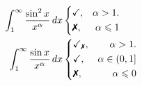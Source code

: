 \begin{minipage}[]{0.35\textwidth}
\begin{equation*}
\begin{split}
        \int_1^{\infty} \frac{\sin^2 x}{x^{\alpha}} \d x
        &\left\{\begin{aligned}
            &{
                \checkmark
            }  ,&{
                \alpha > 1.
            }\\
            &{
                \text{\xmark}
            }  ,&{
                \alpha \leq 1
            }
        \end{aligned} \right. \\
        \int_1^{\infty} \frac{\sin x}{x^{\alpha}} \d x
        &\left\{\begin{aligned}
            &{
                \checkmark_{\text{\xmark}}
            }  ,&{
                \alpha > 1.
            }\\
            &{
                \checkmark
            }  ,&{
                \alpha \in (0, 1]
            }\\
            &{
                \text{\xmark}
            }  ,&{
                \alpha \leq 0
            }
        \end{aligned} \right. \\
\end{split}
\end{equation*}
\end{minipage}
\hfill
